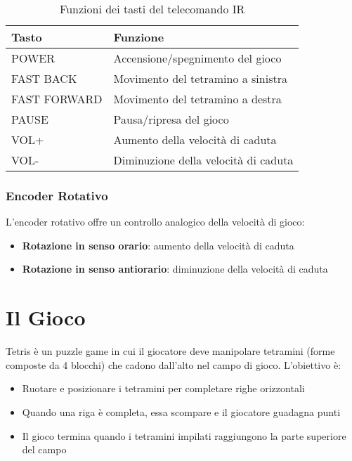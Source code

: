 \documentclass[a4paper, 12pt]{article}
\begin{document}
\begin{table}[H]
    \centering
    \caption{Funzioni dei tasti del telecomando IR}
    \label{tab:ir-functions}
    \begin{tabular}{ll}
        \toprule
        \textbf{Tasto} & \textbf{Funzione}                    \\
        \midrule
        POWER          & Accensione/spegnimento del gioco     \\
        FAST BACK      & Movimento del tetramino a sinistra   \\
        FAST FORWARD   & Movimento del tetramino a destra     \\
        PAUSE          & Pausa/ripresa del gioco              \\
        VOL+           & Aumento della velocità di caduta     \\
        VOL-           & Diminuzione della velocità di caduta \\
        \bottomrule
    \end{tabular}
\end{table}

\subsubsection{Encoder Rotativo}
\label{subsubsec:encoder}
L'encoder rotativo offre un controllo analogico della velocità di gioco:
\begin{itemize}
    \item \textbf{Rotazione in senso orario}: aumento della velocità di caduta
    \item \textbf{Rotazione in senso antiorario}: diminuzione della velocità di caduta
\end{itemize}

\section{Il Gioco}
\label{sec:gioco}
Tetris è un puzzle game in cui il giocatore deve manipolare tetramini (forme composte da 4 blocchi) che cadono dall'alto nel campo di gioco. L'obiettivo è:
\begin{itemize}
    \item Ruotare e posizionare i tetramini per completare righe orizzontali
    \item Quando una riga è completa, essa scompare e il giocatore guadagna punti
    \item Il gioco termina quando i tetramini impilati raggiungono la parte superiore del campo
\end{itemize}
\end{document}
